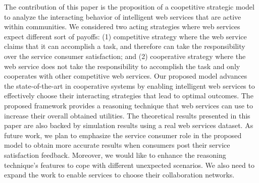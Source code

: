 \documentclass[runningheads,a4paper]{llncs}
\begin{document}
The contribution of this paper is the proposition of a coopetitive
strategic model to analyze the interacting behavior of intelligent
web services that are active within communities. We considered two
acting strategies where web services expect different sort of
payoffs: (1) competitive strategy where the web service claims
that it can accomplish a task, and therefore can take the
responsibility over the service consumer satisfaction; and (2)
cooperative strategy where the web service does not take the
responsibility to accomplish the task and only cooperates with
other competitive web services. Our proposed model advances the
state-of-the-art in cooperative systems by enabling intelligent
web services to effectively choose their interacting strategies
that lead to optimal outcomes. The proposed framework provides a
reasoning technique that web services can use to increase their
overall obtained utilities. The theoretical results presented in
this paper are also backed by simulation results using a real web
services dataset. As future work, we plan to emphasize the service
consumer role in the proposed model to obtain more accurate
results when consumers post their service satisfaction feedback.
Moreover, we would like to enhance  the reasoning technique's
features to cope with different unexpected scenarios. We also need
to expand the work to enable services to choose their
collaboration networks.
\end{document}
